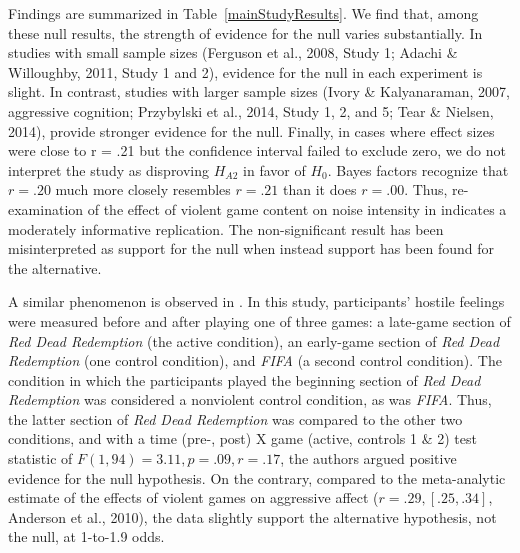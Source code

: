 \documentclass[man]{apa6}
\begin{document}
Findings are summarized in Table~\ref{mainStudyResults}. We find that, among these null results, the strength of evidence for the null varies substantially. In studies with small sample sizes (Ferguson et al., 2008, Study 1; Adachi \& Willoughby, 2011, Study 1 and 2), evidence for the null in each experiment is slight. 
In contrast, studies with larger sample sizes (Ivory \& Kalyanaraman, 2007, aggressive cognition; Przybylski et al., 2014, Study 1, 2, and 5; Tear \& Nielsen, 2014), \nocite{Ivory:Kalyanaraman:2007;Przybylski:etal:2014;Tear:Nielsen:2014} provide stronger evidence for the null.	Finally, in cases where effect sizes were close to r = .21 but the confidence interval failed to exclude zero, we do not interpret the study as disproving $H_{A2}$ in favor of $H_0$. Bayes factors recognize that $r = .20$ much more closely resembles $r = .21$ than it does $r = .00$. Thus, re-examination of the effect of violent game content on noise intensity in \citet{Elson:etal:2013} indicates a moderately informative replication. The non-significant result has been misinterpreted as support for the null when instead support has been found for the alternative.

A similar phenomenon is observed in \citet{Valadez:Ferguson:2012}. In this study, participants' hostile feelings were measured before and after playing one of three games: a late-game section of {\em Red Dead Redemption} (the active condition), an early-game section of {\em Red Dead Redemption} (one control condition), and {\em FIFA} (a second control condition). The condition in which the participants played the beginning section of {\em Red Dead Redemption} was considered a nonviolent control condition, as was {\em FIFA}. Thus, the latter section of {\em Red Dead Redemption} was compared to the other two conditions, and with a time (pre-, post) X game (active, controls 1 \& 2) test statistic of $F(1, 94) = 3.11, p = .09, r = .17$, the authors argued positive evidence for the null hypothesis. On the contrary, compared to the meta-analytic estimate of the effects of violent games on aggressive affect ($r = .29, [.25, .34]$, Anderson et al., 2010), the data slightly support the alternative hypothesis, not the null, at 1-to-1.9 odds. 
\end{document}
